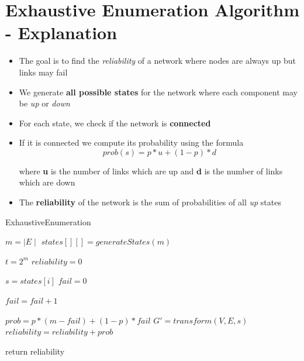 \documentclass[12pt,letterpaper,titlepage,en-US]{article}
\begin{document}
\section{Exhaustive Enumeration Algorithm - Explanation}
\begin{itemize}


\item The goal is to find the \textit{reliability} of a network where nodes are always up but links may fail

\item We generate \textbf{all possible states} for the network where each component may be \textit{up} or \textit{down}

\item For each state, we check if the network is \textbf{connected}

\item If it is connected we compute its probability using the formula
\begin{equation}
prob(s)=p*u + (1-p)*d
\end{equation}

where \textbf{u} is the number of links which are up and \textbf{d} is the number of links which are down


\item The \textbf{reliability} of the network is the sum of probabilities of all \textit{up} states





\end{itemize}








\begin{algorithm}[H]
    \caption{ExhaustiveEnumeration}
    \begin{algorithmic}[1]
      
      \State $m= \mid E \mid$
      \State $states[][] = generateStates(m)$
      
      \State $t = 2^m $
     \State $reliability=0$
      
      
      	
      	\State $ s = states[i]$
      	\State $fail=0$
      	
      			\State $fail=fail+1$
      			\EndIf
      			\EndFor
      			
      	\State $prob=p*(m-fail)+(1-p)*fail$
      	\State $G' = transform(V,E,s)$
      	\State $reliability=reliability+prob$
      	\EndIf
      	
      	
      \EndFor
      
        
      
     
     
      return reliability
        \EndProcedure
    \end{algorithmic}
    \end{algorithm}
\end{document}
